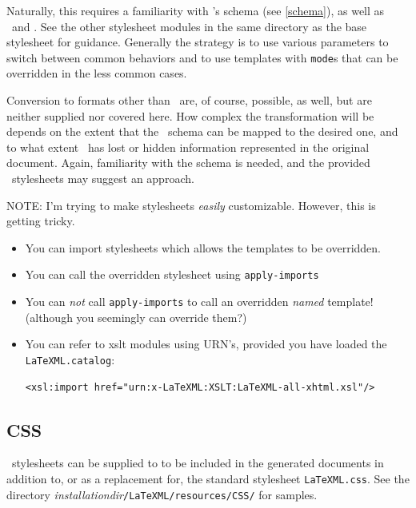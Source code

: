 \documentclass{book}
\begin{document}
Naturally, this requires a familiarity with \LaTeXML's schema (see \ref{schema}),
as well as \XSLT\ and \XHTML.  See the other stylesheet modules in the same directory
as the base stylesheet for guidance.
Generally the strategy is to use various parameters to switch
between common behaviors and to use templates with \texttt{mode}s
that can be overridden in the less common cases.

Conversion to formats other than \XHTML\ are, of course, possible, as well,
but are neither supplied nor covered here.
How complex the transformation will be depends on the extent
that the \LaTeXML\ schema can be mapped to the desired one,
and to what extent \LaTeXML\ has lost or hidden information
represented in the original document.  Again, familiarity with the schema is needed,
and the provided \XHTML\ stylesheets may suggest an approach.

NOTE: I'm trying to make stylesheets \emph{easily} customizable.
However, this is getting tricky.
\begin{itemize}
\item You can import stylesheets which allows the templates to be overridden.
\item You can call the overridden stylesheet using \texttt{apply-imports}
\item You can \emph{not} call \texttt{apply-imports} to call an overridden
\emph{named} template! (although you seemingly can override them?)
\item You can refer to xslt modules using URN's, provided you have loaded
the \texttt{LaTeXML.catalog}:
{\small
\begin{lstlisting}[style=xml]
<xsl:import href="urn:x-LaTeXML:XSLT:LaTeXML-all-xhtml.xsl"/>
\end{lstlisting}
}
\end{itemize}

\subsection{CSS}\label{customization.latexmlpost.css}
\CSS\ stylesheets can be supplied to  to
be included in the generated documents in addition to, or as a
replacement for, the standard stylesheet \texttt{LaTeXML.css}.
See the directory
\textit{installationdir}\texttt{/LaTeXML/resources/CSS/}
for samples.
\end{document}
